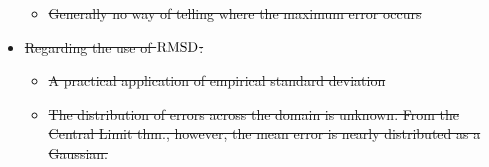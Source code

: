 \begin{framed}
\begin{itemize}
\begin{itemize}
                    \item \sout{Generally no way of telling where the maximum error occurs}
                \end{itemize}
            \item \sout{Regarding the use of $\operatorname{RMSD}$:}
                    \begin{itemize}
                        \item \sout{A practical application of empirical standard deviation}
                        \item \sout{The distribution of errors across the domain is unknown. From the Central Limit thm., however,
                            the mean error is nearly distributed as a Gaussian.}
                    \end{itemize}
    \end{itemize}
\end{framed}
